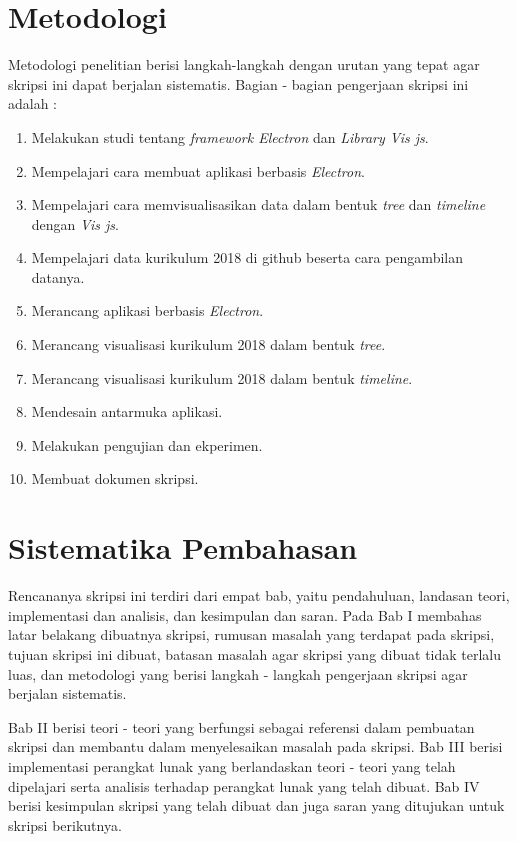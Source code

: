 \section{Metodologi}
\label{sec:metlit}
Metodologi penelitian berisi langkah-langkah dengan urutan yang tepat agar skripsi ini dapat berjalan sistematis. Bagian - bagian pengerjaan skripsi ini adalah :
\begin{enumerate}
    \item Melakukan studi tentang \textit{framework Electron} dan \textit{Library Vis js}.
    \item Mempelajari cara membuat aplikasi berbasis \textit{Electron}.
    \item Mempelajari cara memvisualisasikan data dalam bentuk \textit{tree} dan \textit{timeline} dengan \textit{Vis js}.
    \item Mempelajari data kurikulum 2018 di github beserta cara pengambilan datanya.
    \item Merancang aplikasi berbasis \textit{Electron}.
    \item Merancang visualisasi kurikulum 2018 dalam bentuk \textit{tree}.
    \item Merancang visualisasi kurikulum 2018 dalam bentuk \textit{timeline}.
    \item Mendesain antarmuka aplikasi.
    \item Melakukan pengujian dan ekperimen.
    \item Membuat dokumen skripsi.
\end{enumerate}



\section{Sistematika Pembahasan}
\label{sec:sispem}
Rencananya skripsi ini terdiri dari empat bab, yaitu pendahuluan, landasan teori, implementasi dan analisis, dan kesimpulan dan saran. Pada Bab I membahas latar belakang dibuatnya skripsi, rumusan masalah yang terdapat pada skripsi, tujuan skripsi ini dibuat, batasan masalah agar skripsi yang dibuat tidak terlalu luas, dan metodologi yang berisi langkah - langkah pengerjaan skripsi agar berjalan sistematis.

Bab II berisi teori - teori yang berfungsi sebagai referensi dalam pembuatan skripsi dan membantu dalam menyelesaikan masalah pada skripsi. Bab III berisi implementasi perangkat lunak yang berlandaskan teori - teori yang telah dipelajari serta analisis terhadap perangkat lunak yang telah dibuat. Bab IV berisi kesimpulan skripsi yang telah dibuat dan juga saran yang ditujukan untuk skripsi berikutnya. 

